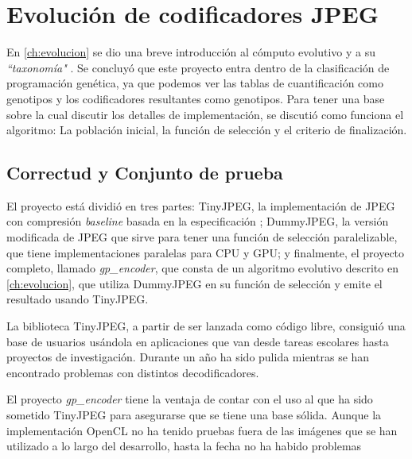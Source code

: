 
\chapter{Evolución de codificadores JPEG}\label{ch:resultados_evolucion}

En \ref{ch:evolucion} se dio una breve introducción al cómputo evolutivo y a su
\emph{ ``taxonomía" }. Se concluyó que este proyecto entra dentro de la
clasificación de programación genética, ya que podemos ver las tablas de
cuantificación como genotipos y los codificadores resultantes como genotipos.
Para tener una base sobre la cual discutir los detalles de implementación, se
discutió como funciona el algoritmo: La población inicial, la función de
selección y el criterio de finalización.

\section{Correctud y Conjunto de prueba} \label{sec:testset}

El proyecto está dividió en tres partes: TinyJPEG, la implementación de JPEG
con compresión \emph{baseline} basada en la especificación \cite{jpeg-spec};
DummyJPEG, la versión modificada de JPEG que sirve para tener una función de
selección paralelizable, que tiene implementaciones paralelas para CPU y GPU; y
finalmente, el proyecto completo, llamado \emph{gp\_encoder}, que consta de un
algoritmo evolutivo descrito en \ref{ch:evolucion}, que utiliza DummyJPEG en su
función de selección y emite el resultado usando TinyJPEG.

La biblioteca TinyJPEG, a partir de ser lanzada como código libre, consiguió
una base de usuarios usándola en aplicaciones que van desde tareas escolares
hasta proyectos de investigación. Durante un año ha sido pulida mientras se han
encontrado problemas con distintos decodificadores.

El proyecto \emph{gp\_encoder} tiene la ventaja de contar con el uso al que ha
sido sometido TinyJPEG para asegurarse que se tiene una base sólida. Aunque la
implementación OpenCL no ha tenido pruebas fuera de las imágenes que se han
utilizado a lo largo del desarrollo, hasta la fecha no ha habido problemas


